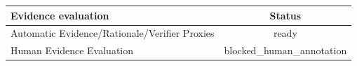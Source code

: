 \begin{tabular}{lc}
\toprule
Evidence evaluation & Status \\ 
\midrule
Automatic Evidence/Rationale/Verifier Proxies & ready \\
Human Evidence Evaluation & blocked\_human\_annotation \\
\bottomrule
\end{tabular}
